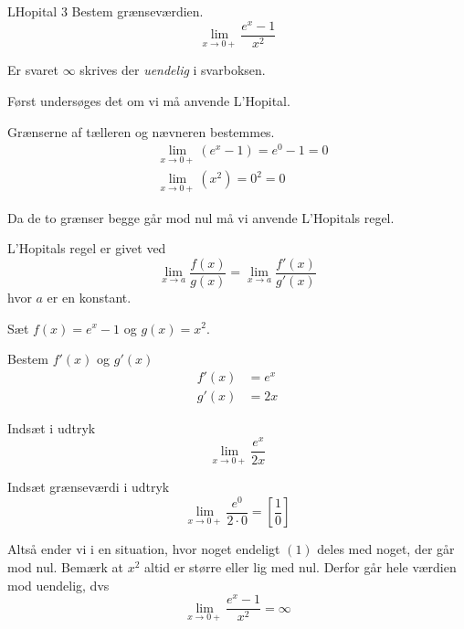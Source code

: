 \documentclass{article}
\begin{document}
\begin{exercise}{LHopital 3}
Bestem grænseværdien.
\[
\lim_{x \to 0+} \frac{e^x - 1}{x^2}
\] 

Er svaret $\infty$ skrives der \emph{uendelig} i svarboksen.


\hint
Først undersøges det om vi må anvende L'Hopital.

\hint
Grænserne af tælleren og nævneren bestemmes.
\begin{align*}
	&\lim_{x \to 0+} (e^x - 1) = e^0 - 1 = 0 \\
	&\lim_{x \to 0+} (x^2) = 0^2  = 0
\end{align*}

\hint
Da de to grænser begge går mod nul må vi  anvende L'Hopitals regel. 

\hint
L'Hopitals regel er givet ved
\[
\lim_{x \to a} \frac{f(x)}{g(x)} = \lim_{x \to a} \frac{f'(x)}{g'(x)} 
\]
hvor $a$ er en konstant.

\hint
Sæt $f(x) = e^x - 1$ og $g(x) = x^2$. 

\hint
Bestem $f'(x)$ og $g'(x)$
\begin{align*}
	f'(x) &= e^x \\
	g'(x) &= 2x
\end{align*}

\hint
Indsæt i udtryk 
\[
\lim_{x \to 0+} \frac{e^x}{2x} 
\]

\hint
Indsæt grænseværdi i udtryk
\[
\lim_{x \to 0+} \frac{e^0}{2 \cdot 0}  = \left[ \frac{1}{0}  \right] 
\]

\hint
Altså ender vi i en situation, hvor noget endeligt $(1)$ deles med noget, der går mod nul. Bemærk at $x^2$ altid er større eller lig med nul. Derfor går hele værdien mod uendelig, dvs
\[
\lim_{x \to 0+} \frac{e^x-1}{x^2} = \infty
\]
\end{exercise}
\end{document}

